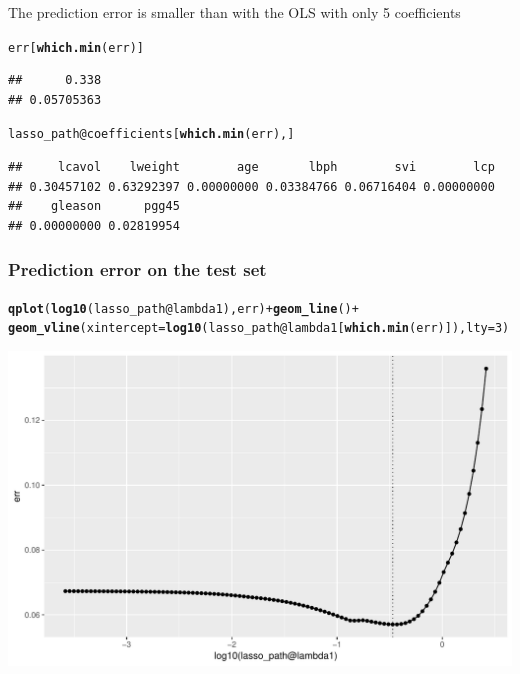 \documentclass[10pt, c, xcolor=x11names]{beamer}\usepackage[]{graphicx}\usepackage[]{color}
\makeatletter
\newcommand{\hlnum}[1]{\textcolor[rgb]{0.686,0.059,0.569}{#1}}%
\newcommand{\hlopt}[1]{\textcolor[rgb]{0,0,0}{#1}}%
\newcommand{\hlstd}[1]{\textcolor[rgb]{0.345,0.345,0.345}{#1}}%
\newcommand{\hlkwc}[1]{\textcolor[rgb]{0.333,0.667,0.333}{#1}}%
\newcommand{\hlkwd}[1]{\textcolor[rgb]{0.737,0.353,0.396}{\textbf{#1}}}%
\newenvironment{kframe}{%
 \def\at@end@of@kframe{}%
 \ifinner\ifhmode%
  \def\at@end@of@kframe{\end{minipage}}%
  \begin{minipage}{\columnwidth}%
 \fi\fi%
 \def\FrameCommand##1{\hskip\@totalleftmargin \hskip-\fboxsep
 \colorbox{shadecolor}{##1}\hskip-\fboxsep
     \hskip-\linewidth \hskip-\@totalleftmargin \hskip\columnwidth}%
 \MakeFramed {\advance\hsize-\width
   \@totalleftmargin\z@ \linewidth\hsize
   \@setminipage}}%
 {\par\unskip\endMakeFramed%
 \at@end@of@kframe}
\newenvironment{knitrout}{}{} %
\makeatother
\begin{document}
\begin{frame}
The prediction error is smaller than with the OLS with only 5 coefficients
\begin{knitrout}\scriptsize
{}\color{fgcolor}\begin{kframe}
\begin{alltt}
\hlstd{err[}\hlkwd{which.min}\hlstd{(err)]}
\end{alltt}
\begin{verbatim}
##      0.338 
## 0.05705363
\end{verbatim}
\begin{alltt}
\hlstd{lasso_path}\hlopt{@}\hlkwc{coefficients}\hlstd{[}\hlkwd{which.min}\hlstd{(err), ]}
\end{alltt}
\begin{verbatim}
##     lcavol    lweight        age       lbph        svi        lcp 
## 0.30457102 0.63292397 0.00000000 0.03384766 0.06716404 0.00000000 
##    gleason      pgg45 
## 0.00000000 0.02819954
\end{verbatim}
\end{kframe}
\end{knitrout}

\end{frame}

\begin{frame}[containsverbatim]
  \frametitle{Prediction error on the test set}

\begin{knitrout}\scriptsize
{}\color{fgcolor}\begin{kframe}
\begin{alltt}
\hlkwd{qplot}\hlstd{(}\hlkwd{log10}\hlstd{(lasso_path}\hlopt{@}\hlkwc{lambda1}\hlstd{), err)} \hlopt{+} \hlkwd{geom_line}\hlstd{()} \hlopt{+}
\hlkwd{geom_vline}\hlstd{(}\hlkwc{xintercept} \hlstd{=} \hlkwd{log10}\hlstd{(lasso_path}\hlopt{@}\hlkwc{lambda1}\hlstd{[}\hlkwd{which.min}\hlstd{(err)]),} \hlkwc{lty}\hlstd{=}\hlnum{3}\hlstd{)}
\end{alltt}
\end{kframe}
\includegraphics[width=.8\textwidth]{figures/ridgeunnamed-chunk-29-1} 

\end{knitrout}
\end{frame}
\end{document}
